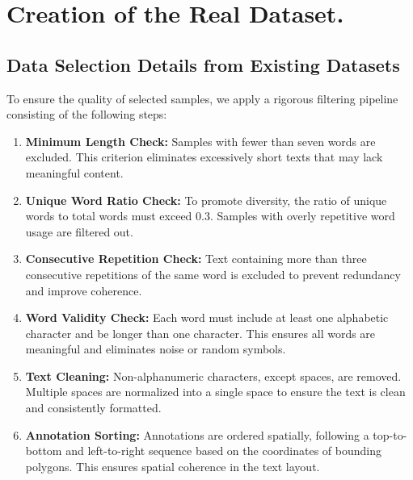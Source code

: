 

\section{Creation of the Real Dataset.}
\label{sec:appendix_create_real}

\subsection{Data Selection Details from Existing Datasets}
\label{sec:appendix_data_selection}
To ensure the quality of selected samples, we apply a rigorous filtering pipeline consisting of the following steps:

\begin{enumerate}
    
    \item \textbf{Minimum Length Check:}  
    Samples with fewer than seven words are excluded. This criterion eliminates excessively short texts that may lack meaningful content.
    
    \item \textbf{Unique Word Ratio Check:}  
    To promote diversity, the ratio of unique words to total words must exceed 0.3. Samples with overly repetitive word usage are filtered out.
    
    \item \textbf{Consecutive Repetition Check:}  
    Text containing more than three consecutive repetitions of the same word is excluded to prevent redundancy and improve coherence.
    
    \item \textbf{Word Validity Check:}  
    Each word must include at least one alphabetic character and be longer than one character. This ensures all words are meaningful and eliminates noise or random symbols.
    
    \item \textbf{Text Cleaning:}  
    Non-alphanumeric characters, except spaces, are removed. Multiple spaces are normalized into a single space to ensure the text is clean and consistently formatted.
    
    \item \textbf{Annotation Sorting:}  
    Annotations are ordered spatially, following a top-to-bottom and left-to-right sequence based on the coordinates of bounding polygons. This ensures spatial coherence in the text layout.
\end{enumerate}

